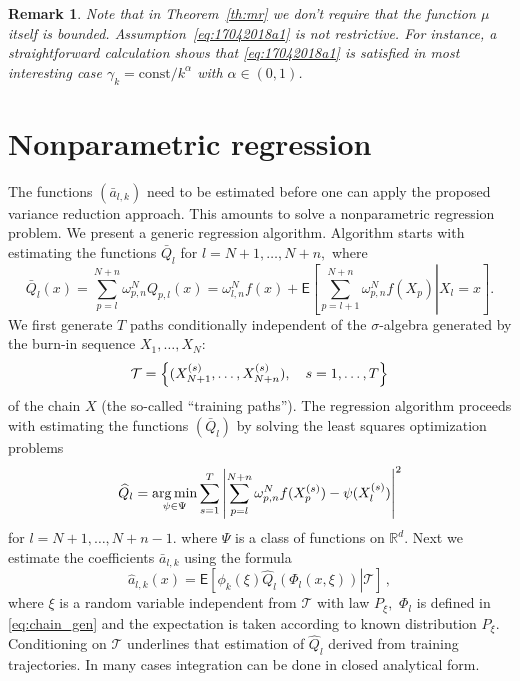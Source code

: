 \documentclass[preprint]{imsart}
\def\NtrainPath{T}
\def\TrainSet{\mathcal{T}}
\newtheorem{remark}{Remark}
\newcommand*{\argmin}{\operatornamewithlimits{arg\,min}}
\newcommand*{\const}{\mathrm{const}}
\begin{document}
\begin{remark}
Note that in  Theorem~\eqref{th:mr} we don't require that  the function \(\mu\) itself is bounded.
Assumption~\eqref{eq:17042018a1} is not restrictive.
For instance, a straightforward calculation shows
that \eqref{eq:17042018a1} is satisfied in most interesting case
$\gamma_k=\const/k^\alpha$ with $\alpha\in (0,1)$.
\end{remark}

\section{Nonparametric regression}
The functions \((\bar a_{l,k})\) need to be estimated before one can apply the proposed variance reduction approach. This amounts to solve a nonparametric regression problem.
We present a generic regression algorithm. Algorithm starts with estimating the functions $\bar{Q}_{l}$ for $l=N+1,\ldots,N+n,$ where
\begin{equation*}
\bar{Q}_{l}(x)=\sum_{p=l}^{N+n} \omega_{p,n}^{N} Q_{p,l}\left(x\right)=\omega_{l,n}^{N}f(x)+\mathsf{E}\left[\left.\sum_{p=l+1}^{N+n}\omega_{p,n}^{N}f(X_{p})\right|X_{l}=x\right] .
\end{equation*}
We first generate \(\NtrainPath\)  paths conditionally independent of the $\sigma$-algebra generated by the burn-in sequence $X_1,\dots,X_N$:
\[
\TrainSet=\Bigl\{(X^{(s)}_{N+1},\ldots,X^{(s)}_{N+n}),\quad s=1,\ldots,\NtrainPath\Bigr\}
\]
of the chain \(X\)
(the so-called ``training paths'').
The regression algorithm proceeds with estimating the  functions \((\bar Q_{l})\) by solving  the least squares optimization problems
\begin{equation}\label{eq:06042018a1}
{\widehat  Q}_{l}=\argmin_{\psi\in \Psi}\sum_{s=1}^{\NtrainPath} \left | \sum_{p=l}^{N+n}\omega_{p,n}^{N}f(X^{(s)}_{p})-\psi(X^{(s)}_{l})\right|^2
\end{equation}
for \(l=N+1,\ldots, N+n-1.\)
where \(\Psi\) is a  class of  functions on \(\mathbb{R}^d.\)
Next  we estimate the coefficients \( \bar a_{l,k}\) using
the formula
\begin{equation}
\label{eq:a_est_int}
\widehat a_{l,k}(x)=\mathsf{E}\left[\left.\phi_k\left(\xi\right)\widehat Q_{l}\left(\Phi_l(x,\xi)\right)\right | \TrainSet\right] \,,
\end{equation}
where $\xi$ is a random variable independent from $\mathcal{T}$ with law $P_\xi,$
$\Phi_l$ is defined in \eqref{eq:chain_gen} and the expectation is taken according to known distribution \(P_\xi\). Conditioning on $\TrainSet$ underlines that estimation of $\widehat Q_{l}$ derived from training trajectories. In many cases integration can be done in closed analytical form.
\end{document}
